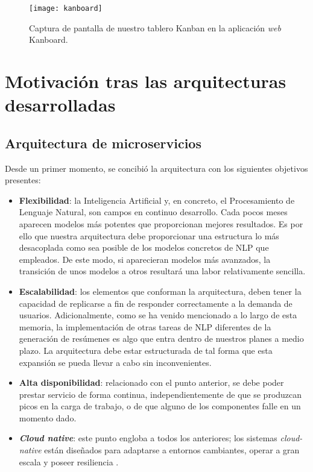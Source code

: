 \begin{figure}[h]
	\centering
	\texttt{[image: kanboard]}
	\caption[Tablero de Kanboard.]{Captura de pantalla de nuestro tablero Kanban en la aplicación \emph{web} Kanboard.}
\end{figure}


\section{Motivación tras las arquitecturas desarrolladas}

\subsection{Arquitectura de microservicios}

Desde un primer momento, se concibió la arquitectura con los siguientes objetivos presentes:

\vspace{-0.3cm}
\begin{itemize}
	\item [\textbullet] \textbf{Flexibilidad}: la Inteligencia Artificial y, en concreto, el Procesamiento de Lenguaje Natural, son campos en continuo desarrollo. Cada pocos meses aparecen modelos más potentes que proporcionan mejores resultados. Es por ello que nuestra arquitectura debe proporcionar una estructura lo más desacoplada como sea posible de los modelos concretos de NLP que empleados. De este modo, si aparecieran modelos más avanzados, la transición de unos modelos a otros resultará una labor relativamente sencilla.
	\item [\textbullet] \textbf{Escalabilidad}: los elementos que conforman la arquitectura, deben tener la capacidad de replicarse a fin de responder correctamente a la demanda de usuarios. Adicionalmente, como se ha venido mencionado a lo largo de esta memoria, la implementación de otras tareas de NLP diferentes de la generación de resúmenes es algo que entra dentro de nuestros planes a medio plazo. La arquitectura debe estar estructurada de tal forma que esta expansión se pueda llevar a cabo sin inconvenientes. 
	\item [\textbullet] \textbf{Alta disponibilidad}: relacionado con el punto anterior, se debe poder prestar servicio de forma continua, independientemente de que se produzcan picos en la carga de trabajo, o de que alguno de los componentes falle en un momento dado.
	\item [\textbullet] \textbf{\emph{Cloud native}}: este punto engloba a todos los anteriores; los sistemas \emph{cloud-native} están diseñados para adaptarse a entornos cambiantes, operar a gran escala y poseer resiliencia \cite{cloud20}.
\end{itemize}


